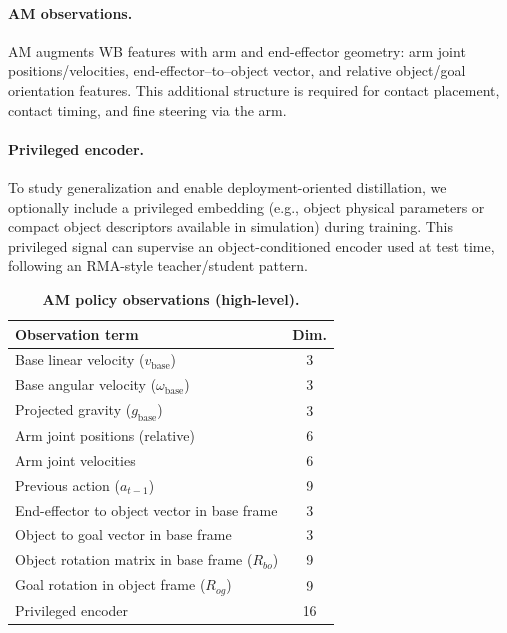 \paragraph{AM observations.}
AM augments WB features with arm and end-effector geometry:
arm joint positions/velocities, end-effector--to--object vector, and relative object/goal orientation features.
This additional structure is required for contact placement, contact timing, and fine steering via the arm.

\paragraph{Privileged encoder.}
To study generalization and enable deployment-oriented distillation, we optionally include a privileged embedding
(e.g., object physical parameters or compact object descriptors available in simulation) during training.
This privileged signal can supervise an object-conditioned encoder used at test time, following an RMA-style teacher/student pattern.

\begin{table}[t]
\centering
\caption{\textbf{AM policy observations (high-level).}}
\label{tab:obs_am}
\scriptsize
\setlength{\tabcolsep}{3pt}
\renewcommand{\arraystretch}{1.08}
\begin{tabular}{l c}
\toprule
\textbf{Observation term} & \textbf{Dim.}\\
\midrule
Base linear velocity ($v_{\text{base}}$) & 3\\
Base angular velocity ($\omega_{\text{base}}$) & 3\\
Projected gravity ($g_{\text{base}}$) & 3\\
Arm joint positions (relative) & 6\\
Arm joint velocities & 6\\
Previous action ($a_{t-1}$) & 9\\
\addlinespace[0.25em]\hline\addlinespace[0.15em]
End-effector to object vector in base frame & 3\\
Object to goal vector in base frame & 3\\
Object rotation matrix in base frame ($R_{bo}$) & 9\\
Goal rotation in object frame ($R_{og}$) & 9\\
\addlinespace[0.25em]\hline\addlinespace[0.15em]
Privileged encoder & 16\\
\bottomrule
\end{tabular}
\end{table}













